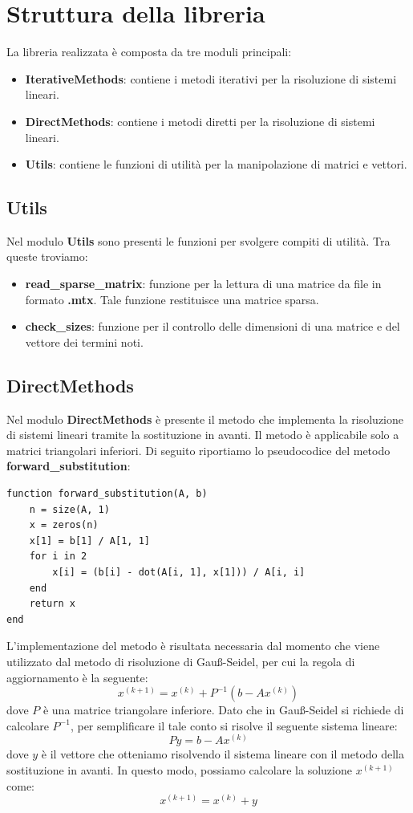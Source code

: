 \section{Struttura della libreria}
La libreria realizzata è composta da tre moduli principali:
\begin{itemize}
    \item \textbf{IterativeMethods}: contiene i metodi iterativi per la risoluzione
          di sistemi lineari.
    \item \textbf{DirectMethods}: contiene i metodi diretti per la risoluzione
          di sistemi lineari.
    \item \textbf{Utils}: contiene le funzioni di utilità per la manipolazione
          di matrici e vettori.
\end{itemize}

\subsection{Utils}
Nel modulo \textbf{Utils} sono presenti le funzioni per svolgere compiti di
utilità. Tra queste troviamo:
\begin{itemize}
    \item \textbf{read\_sparse\_matrix}: funzione per la lettura di una matrice
          da file in formato \textbf{.mtx}. Tale funzione restituisce una matrice
          sparsa.
    \item \textbf{check\_sizes}: funzione per il controllo delle dimensioni di
          una matrice e del vettore dei termini noti.
\end{itemize}
\subsection{DirectMethods}
Nel modulo \textbf{DirectMethods} è presente il metodo che implementa
la risoluzione di sistemi lineari tramite la sostituzione in avanti. Il metodo
è applicabile solo a matrici triangolari inferiori. Di seguito riportiamo lo
pseudocodice del metodo \textbf{forward\_substitution}:
\begin{verbatim}
function forward_substitution(A, b)
    n = size(A, 1)
    x = zeros(n)
    x[1] = b[1] / A[1, 1]
    for i in 2
        x[i] = (b[i] - dot(A[i, 1], x[1])) / A[i, i]
    end
    return x
end
\end{verbatim}
L'implementazione del metodo è risultata necessaria dal momento che viene
utilizzato dal metodo di risoluzione di Gauß-Seidel, per cui la regola di
aggiornamento è la seguente:
\begin{equation}
    x^{(k+1)} = x^{(k)} + P^{-1}(b - Ax^{(k)})
\end{equation}
dove $P$ è una matrice triangolare inferiore. Dato che in Gauß-Seidel si richiede
di calcolare $P^{-1}$, per semplificare il tale conto si risolve il seguente sistema
lineare:
\begin{equation}
    Py = b - Ax^{(k)}
\end{equation}
dove $y$ è il vettore che otteniamo risolvendo il sistema lineare con il metodo
della sostituzione in avanti. In questo modo, possiamo calcolare la soluzione
$x^{(k+1)}$ come:
\begin{equation}
    x^{(k+1)} = x^{(k)} + y
\end{equation}
